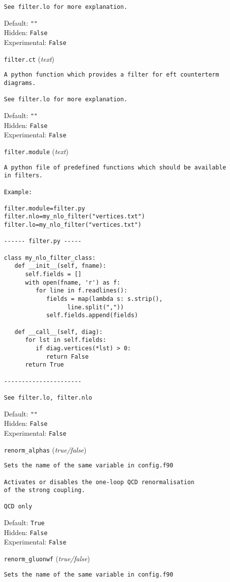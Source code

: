 \begin{basedescript}{\desclabelstyle{\pushlabel}}
\begin{verbatim}
See filter.lo for more explanation.
\end{verbatim}
Default: \verb|""|
\\Hidden: \verb|False|
\\Experimental: \verb|False|
\\\item[\colorbox{gray!30}{\texttt{filter.ct}}] (\textit{text})
\begin{verbatim}
A python function which provides a filter for eft counterterm diagrams.

See filter.lo for more explanation.
\end{verbatim}
Default: \verb|""|
\\Hidden: \verb|False|
\\Experimental: \verb|False|
\\\item[\colorbox{gray!30}{\texttt{filter.module}}] (\textit{text})
\begin{verbatim}
A python file of predefined functions which should be available
in filters.

Example:

filter.module=filter.py
filter.nlo=my_nlo_filter("vertices.txt")
filter.lo=my_nlo_filter("vertices.txt")

------ filter.py -----

class my_nlo_filter_class:
   def __init__(self, fname):
      self.fields = []
      with open(fname, 'r') as f:
         for line in f.readlines():
            fields = map(lambda s: s.strip(),
                  line.split(","))
            self.fields.append(fields)

   def __call__(self, diag):
      for lst in self.fields:
         if diag.vertices(*lst) > 0:
            return False
      return True

----------------------

See filter.lo, filter.nlo
\end{verbatim}
Default: \verb|""|
\\Hidden: \verb|False|
\\Experimental: \verb|False|
\\\item[\colorbox{gray!30}{\texttt{renorm\_alphas}}] (\textit{true/false})
\begin{verbatim}
Sets the name of the same variable in config.f90

Activates or disables the one-loop QCD renormalisation
of the strong coupling.

QCD only
\end{verbatim}
Default: \verb|True|
\\Hidden: \verb|False|
\\Experimental: \verb|False|
\\\item[\colorbox{gray!30}{\texttt{renorm\_gluonwf}}] (\textit{true/false})
\begin{verbatim}
Sets the name of the same variable in config.f90


\end{verbatim}
\end{basedescript}
